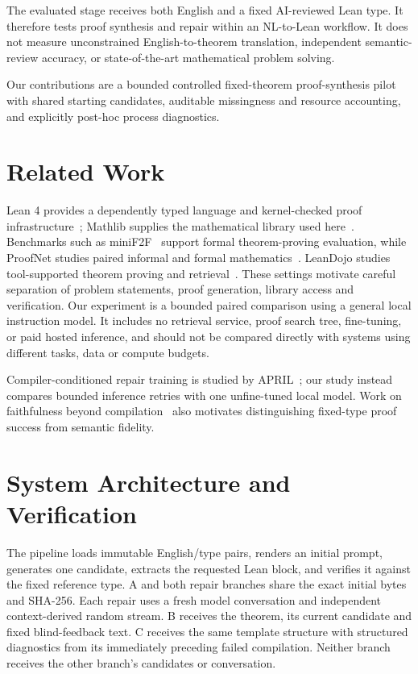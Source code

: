 \documentclass[runningheads,a4paper]{llncs}
\begin{document}
The evaluated stage receives both English and a fixed AI-reviewed Lean type.
It therefore tests proof synthesis and repair within an NL-to-Lean workflow.
It does not measure unconstrained English-to-theorem translation, independent
semantic-review accuracy, or state-of-the-art mathematical problem solving.

Our contributions are a bounded controlled fixed-theorem proof-synthesis
pilot with shared starting candidates, auditable missingness and resource
accounting, and explicitly post-hoc process diagnostics.

\section{Related Work}
Lean 4 provides a dependently typed language and kernel-checked proof
infrastructure~\cite{demoura2021lean4}; Mathlib supplies the mathematical
library used here~\cite{mathlib2020}. Benchmarks such as
miniF2F~\cite{zheng2022minif2f} support formal theorem-proving evaluation,
while ProofNet studies paired informal and formal
mathematics~\cite{azerbayev2023proofnet}. LeanDojo studies tool-supported
theorem proving and retrieval~\cite{yang2023leandojo}. These settings motivate
careful separation of problem statements, proof generation, library access and
verification. Our experiment is a bounded paired comparison using a general
local instruction model. It includes no retrieval service, proof search tree,
fine-tuning, or paid hosted inference, and should not be compared directly with
systems using different tasks, data or compute budgets.

Compiler-conditioned repair training is studied by APRIL~\cite{wang2026april};
our study instead compares bounded inference retries with one unfine-tuned local
model. Work on faithfulness beyond compilation~\cite{zhang2026beyond} also
motivates distinguishing fixed-type proof success from semantic fidelity.

\section{System Architecture and Verification}
The pipeline loads immutable English/type pairs, renders an initial prompt,
generates one candidate, extracts the requested Lean block, and verifies it
against the fixed reference type. A and both repair branches share the exact
initial bytes and SHA-256. Each repair uses a fresh model conversation and
independent context-derived random stream. B receives the theorem, its current
candidate and fixed blind-feedback text. C receives the same template structure
with structured diagnostics from its immediately preceding failed compilation.
Neither branch receives the other branch's candidates or conversation.
\end{document}
